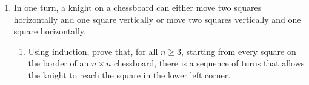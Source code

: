 \documentclass[11pt]{article}
\begin{document}
\begin{enumerate}
\begin{solution}
\end{solution}


\item
\begin{question}
In one turn, a knight on a chessboard can either move two squares horizontally and one square vertically
or move two squares vertically and one square horizontally.
\end{question}

\begin{enumerate}
\item
\begin{question}
Using induction, prove that, for all $n \geq 3$, starting from every square on the border of an $n \times n$ chessboard, there is a sequence of turns that allows the knight to reach the square in the lower left corner.
\end{question}


\end{enumerate}
\end{enumerate}
\end{document}
